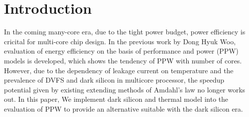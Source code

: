 \section{Introduction}
In the coming many-core era, due to the tight power budget, power efficiency is cricital for multi-core chip design. In the previous work by Dong Hyuk Woo, evaluation of energy efficiency on the basis of performance and power (PPW) models is developed, which shows the tendency of PPW with number of cores. However, due to the dependency of leakage current on temperature and the prevalence of DVFS and dark silicon in multicore processor, the speedup potential given by existing extending methods of Amdahl's law no longer works out. In this paper, We implement dark silicon and thermal model into the evaluation of PPW to provide an alternative suitable with the dark silicon era.